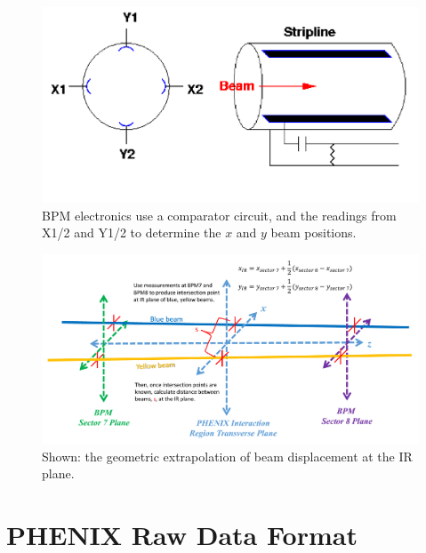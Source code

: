 \begin{figure}[ht]
  \begin{center}
    \includegraphics[width=1.0\linewidth]{./figures/bpm_schematic}
    \caption{ 
      BPM electronics use a comparator circuit, and the readings from X1/2 and
      Y1/2 to determine the $x$ and $y$ beam positions. 
    }
    \label{fig:bpm_schematic_cartoon}
  \end{center}
\end{figure}


\begin{figure}[ht]
\begin{center}
\includegraphics[width=1.0\linewidth]{./figures/bpm_ir_beam_separation}
\caption{
  Shown: the geometric extrapolation of beam displacement at the IR plane.
}
\label{fig:bpm_ir_xing_cartoon}
\end{center}
\end{figure}

\section{PHENIX Raw Data Format} 


